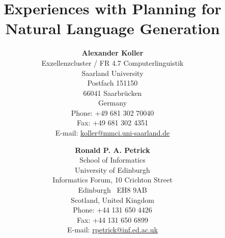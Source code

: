 \documentclass[letterpaper]{article}
\title{Experiences with Planning for Natural Language Generation}
\author{\textbf{Alexander Koller} \\
Exzellenzcluster / FR 4.7 Computerlinguistik \\
Saarland University \\
Postfach 151150 \\
66041 Saarbr\"ucken \\
Germany \\
Phone: +49 681 302 70040 \\
Fax: +49 681 302 4351 \\
E-mail: \url{koller@mmci.uni-saarland.de}
\and
\textbf{Ronald P. A. Petrick} \\
School of Informatics \\
University of Edinburgh \\
Informatics Forum, 10 Crichton Street \\
Edinburgh \ EH8 9AB \\
Scotland, United Kingdom \\
Phone: +44 131 650 4426 \\
Fax: +44 131 650 6899 \\
E-mail: \url{rpetrick@inf.ed.ac.uk}}
\date{}
\begin{document}
\maketitle

\pagebreak


\pagebreak











\pagebreak
\listoffigures
\end{document}
